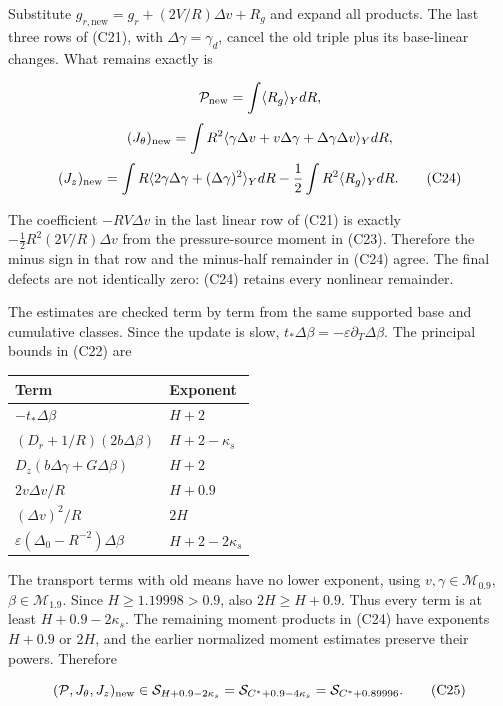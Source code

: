 \documentclass[10pt,a4paper]{article}
\newcounter{none}
\begin{document}
Substitute \(g_{r,\mathrm{new}}=g_r+(2V/R)\Delta v+R_g\) and expand all products. The last three rows of (C21), with \(\Delta\gamma=\gamma_d\), cancel the old triple plus its base-linear changes. What remains exactly is

\[
\mathcal P_{\rm new}=\int\langle R_g\rangle_YdR,
\] \[
(J_\theta)_{\rm new}
=\int R^2\langle\gamma\Delta v+v\Delta\gamma+\Delta\gamma\Delta v\rangle_YdR,
\] \[
(J_z)_{\rm new}
=\int R\langle2\gamma\Delta\gamma+(\Delta\gamma)^2\rangle_YdR
-\frac12\int R^2\langle R_g\rangle_YdR.
\tag{C24}
\]

The coefficient \(-RV\Delta v\) in the last linear row of (C21) is exactly \(-\frac12R^2(2V/R)\Delta v\) from the pressure-source moment in (C23). Therefore the minus sign in that row and the minus-half remainder in (C24) agree. The final defects are not identically zero: (C24) retains every nonlinear remainder.

The estimates are checked term by term from the same supported base and cumulative classes. Since the update is slow, \(t_*\Delta\beta=-\varepsilon\partial_T\Delta\beta\). The principal bounds in (C22) are

{\def\LTcaptype{none} %
\begin{longtable}[]{@{}ll@{}}
\toprule\noalign{}
Term & Exponent \\
\midrule\noalign{}
\endhead
\bottomrule\noalign{}
\endlastfoot
\(-t_*\Delta\beta\) & \(H+2\) \\
\((D_r+1/R)(2b\Delta\beta)\) & \(H+2-\kappa_s\) \\
\(D_z(b\Delta\gamma+G\Delta\beta)\) & \(H+2\) \\
\(2v\Delta v/R\) & \(H+0.9\) \\
\((\Delta v)^2/R\) & \(2H\) \\
\(\varepsilon(\Delta_0-R^{-2})\Delta\beta\) & \(H+2-2\kappa_s\) \\
\end{longtable}
}

The transport terms with old means have no lower exponent, using \(v,\gamma\in\mathcal M_{0.9}\), \(\beta\in\mathcal M_{1.9}\). Since \(H\ge1.19998>0.9\), also \(2H\ge H+0.9\). Thus every term is at least \(H+0.9-2\kappa_s\). The remaining moment products in (C24) have exponents \(H+0.9\) or \(2H\), and the earlier normalized moment estimates preserve their powers. Therefore

\[
(\mathcal P,J_\theta,J_z)_{\rm new}
\in\mathcal S_{H+0.9-2\kappa_s}
=\mathcal S_{C^*+0.9-4\kappa_s}
=\mathcal S_{C^*+0.89996}.
\tag{C25}
\]
\end{document}
